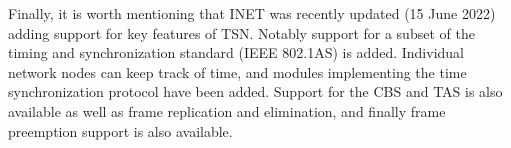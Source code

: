 Finally, it is worth mentioning that INET was recently updated (15 June 2022) adding support for key features of TSN. Notably support for a subset of the timing and synchronization standard (IEEE 802.1AS) is added. Individual network nodes can keep track of time, and modules implementing the time synchronization protocol have been added. Support for the CBS and TAS is also available as well as frame replication and elimination, and finally frame preemption support is also available.
